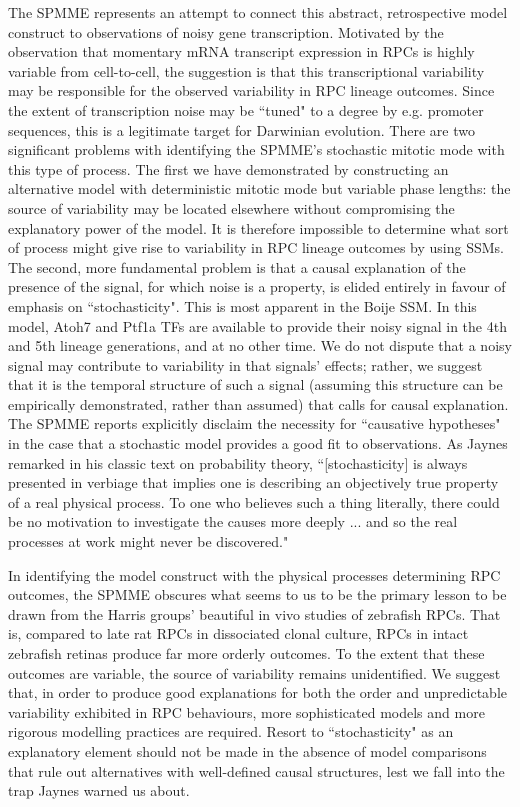 \documentclass[10pt,letterpaper]{article}
\begin{document}
The SPMME represents an attempt to connect this abstract, retrospective model construct to observations of noisy gene transcription\cite{Raj2008}. Motivated by the observation that momentary mRNA transcript expression in RPCs is highly variable from cell-to-cell\cite{Trimarchi2008}, the suggestion is that this transcriptional variability may be responsible for the observed variability in RPC lineage outcomes. Since the extent of transcription noise may be ``tuned" to a degree by e.g. promoter sequences\cite{Raser2004}, this is a legitimate target for Darwinian evolution. There are two significant problems with identifying the SPMME's stochastic mitotic mode with this type of process. The first we have demonstrated by constructing an alternative model with deterministic mitotic mode but variable phase lengths: the source of variability may be located elsewhere without compromising the explanatory power of the model. It is therefore impossible to determine what sort of process might give rise to variability in RPC lineage outcomes by using SSMs. The second, more fundamental problem is that a causal explanation of the presence of the signal, for which noise is a property, is elided entirely in favour of emphasis on ``stochasticity". This is most apparent in the Boije SSM. In this model, Atoh7 and Ptf1a TFs are available to provide their noisy signal in the 4th and 5th lineage generations, and at no other time. We do not dispute that a noisy signal may contribute to variability in that signals' effects; rather, we suggest that it is the temporal structure of such a signal (assuming this structure can be empirically demonstrated, rather than assumed) that calls for causal explanation. The SPMME reports explicitly disclaim the necessity for ``causative hypotheses" in the case that a stochastic model provides a good fit to observations. As Jaynes remarked in his classic text on probability theory, ``[stochasticity] is always presented in verbiage that implies one is describing an objectively true property of a real physical process. To one who believes such a thing literally, there could be no motivation to investigate the causes more deeply ... and so the real processes at work might never be discovered."\cite{Jaynes2003} 

In identifying the model construct with the physical processes determining RPC outcomes, the SPMME obscures what seems to us to be the primary lesson to be drawn from the Harris groups' beautiful in vivo studies of zebrafish RPCs. That is, compared to late rat RPCs in dissociated clonal culture, RPCs in intact zebrafish retinas produce far more orderly outcomes. To the extent that these outcomes are variable, the source of variability remains unidentified. We suggest that, in order to produce good explanations for both the order and unpredictable variability exhibited in RPC behaviours, more sophisticated models and more rigorous modelling practices are required. Resort to ``stochasticity" as an explanatory element should not be made in the absence of model comparisons that rule out alternatives with well-defined causal structures, lest we fall into the trap Jaynes warned us about.
 
\end{document}

